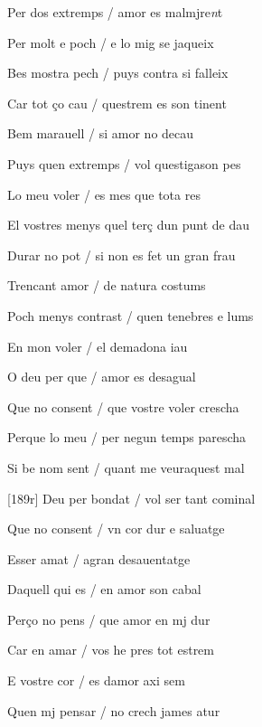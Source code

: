 \documentclass[12pt]{article}
\begin{document}
\begin{estrofa}

 Per dos extremps / amor es malmjre\textit{n}t

 Per molt e poch / e lo mig se jaqueix

 Bes mostra pech / puys contra si falleix

 Car tot \c{c}o cau / questrem es son tinent

 Bem marauell / si amor no decau

 Puys quen extremps / vol questigason pes

 Lo meu voler / es mes que tota res

 El vostres menys quel ter\c{c} dun punt de dau

\end{estrofa}



\begin{estrofa}

 Durar no pot / si non es fet un gran frau

 Trencant amor / de natura costums

 Poch menys contrast / quen tenebres e lums

 En mon voler / el demadona iau

 O deu per que / amor es desagual

 Que no consent / que vostre voler crescha

 Perque lo meu / per negun temps parescha

 Si be nom sent / quant me veuraquest mal

\end{estrofa}



\begin{estrofa}

 [189r] Deu per bondat / vol ser tant cominal

 Que no consent / vn cor dur e saluatge

 Esser amat / agran desauentatge

 Daquell qui es / en amor son cabal

 Per\c{c}o no pens / que amor en mj dur

 Car en amar / vos he pres tot estrem

 E vostre cor / es damor axi sem

 Quen mj pensar / no crech james atur

\end{estrofa}
\end{document}

